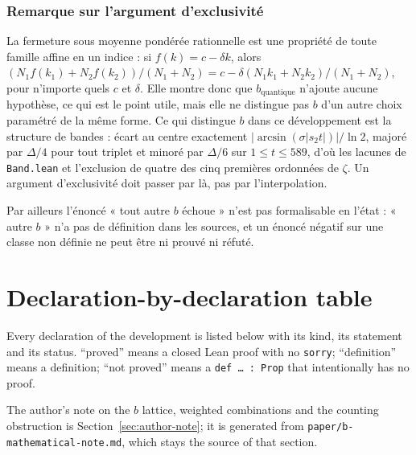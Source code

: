 \documentclass[11pt,a4paper]{article}
\newcommand{\code}[1]{\texttt{#1}}
\theoremstyle{definition}
\theoremstyle{remark}
\begin{document}
\subsubsection*{Remarque sur l'argument d'exclusivité}
La fermeture sous moyenne pondérée rationnelle est une propriété de toute famille affine en un indice : si $f(k) = c - \delta k$, alors $(N_1 f(k_1) + N_2 f(k_2))/(N_1 + N_2) = c - \delta (N_1 k_1 + N_2 k_2)/(N_1 + N_2)$, pour n'importe quels $c$ et $\delta$. Elle montre donc que $b_{\mathrm{quantique}}$ n'ajoute aucune hypothèse, ce qui est le point utile, mais elle ne distingue pas $b$ d'un autre choix paramétré de la même forme. Ce qui distingue $b$ dans ce développement est la structure de bandes : écart au centre exactement $\lvert\arcsin(\sigma\lvert s_2 t\rvert)\rvert/\ln 2$, majoré par $\Delta/4$ pour tout triplet et minoré par $\Delta/6$ sur $1 \le t \le 589$, d'où les lacunes de \code{Band.lean} et l'exclusion de quatre des cinq premières ordonnées de $\zeta$. Un argument d'exclusivité doit passer par là, pas par l'interpolation.

Par ailleurs l'énoncé « tout autre $b$ échoue » n'est pas formalisable en l'état : « autre $b$ » n'a pas de définition dans les sources, et un énoncé négatif sur une classe non définie ne peut être ni prouvé ni réfuté.


\section{Declaration-by-declaration table}\label{sec:table}

Every declaration of the development is listed below with its kind, its statement and its
status.  ``proved'' means a closed Lean proof with no \code{sorry}; ``definition'' means a
definition; ``not proved'' means a \code{def \dots{} : Prop} that intentionally has no
proof.

The author's note on the $b$ lattice, weighted combinations and the counting obstruction is
Section~\ref{sec:author-note}; it is generated from \code{paper/b-mathematical-note.md}, which
stays the source of that section.
\end{document}

